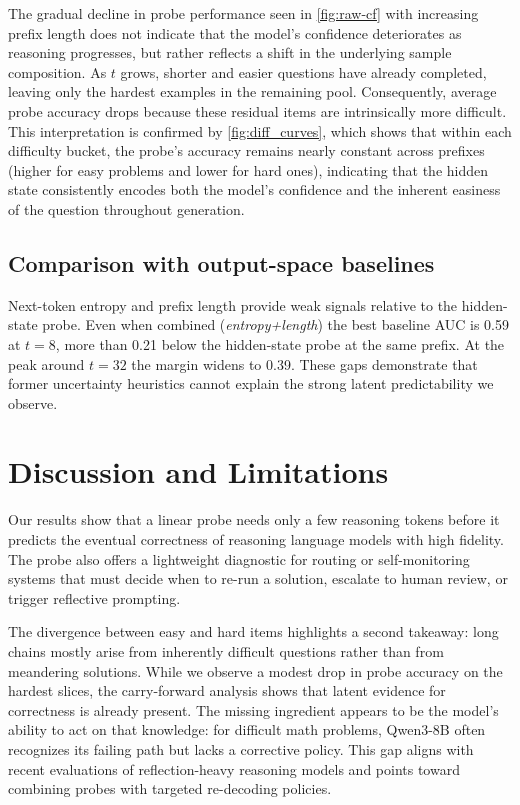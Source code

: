\documentclass[10pt,a4paper,twocolumn]{article}
\begin{document}
The gradual decline in probe performance seen in \cref{fig:raw-cf} with increasing prefix length does not indicate that the model’s confidence deteriorates as reasoning progresses, but rather reflects a shift in the underlying sample composition. As $t$ grows, shorter and easier questions have already completed, leaving only the hardest examples in the remaining pool. Consequently, average probe accuracy drops because these residual items are intrinsically more difficult. This interpretation is confirmed by \cref{fig:diff_curves}, which shows that within each difficulty bucket, the probe’s accuracy remains nearly constant across prefixes (higher for easy problems and lower for hard ones), indicating that the hidden state consistently encodes both the model’s confidence and the inherent easiness of the question throughout generation.


\subsection{Comparison with output-space baselines}
Next-token entropy and prefix length provide weak signals relative to the hidden-state probe. Even when combined (\textit{entropy+length}) the best baseline AUC is 0.59 at $t{=}8$, more than 0.21 below the hidden-state probe at the same prefix. At the peak around $t{=}32$ the margin widens to 0.39. These gaps demonstrate that former uncertainty heuristics cannot explain the strong latent predictability we observe.

\section{Discussion and Limitations}
\label{sec:discussion}
Our results show that a linear probe needs only a few reasoning tokens before it predicts the eventual correctness of reasoning language models with high fidelity. The probe also offers a lightweight diagnostic for routing or self-monitoring systems that must decide when to re-run a solution, escalate to human review, or trigger reflective prompting.

The divergence between easy and hard items highlights a second takeaway: long chains mostly arise from inherently difficult questions rather than from meandering solutions. While we observe a modest drop in probe accuracy on the hardest slices, the carry-forward analysis shows that latent evidence for correctness is already present. The missing ingredient appears to be the model's ability to act on that knowledge: for difficult math problems, Qwen3-8B often recognizes its failing path but lacks a corrective policy. This gap aligns with recent evaluations of reflection-heavy reasoning models and points toward combining probes with targeted re-decoding policies.
\end{document}
